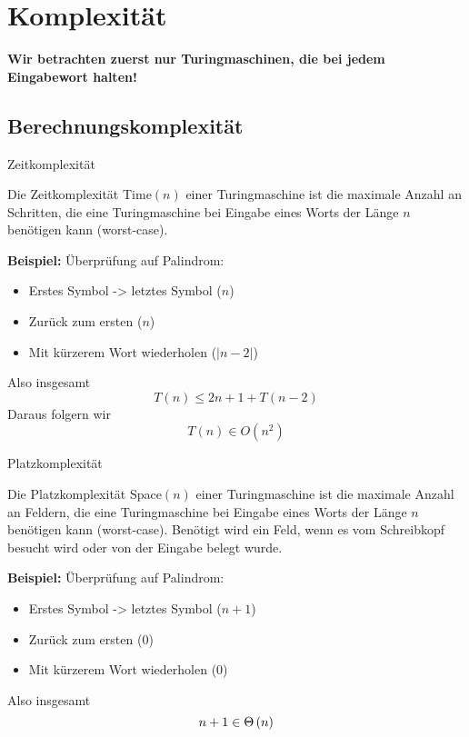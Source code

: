 \section{Komplexität}
\begin{frame}[plain] \large \bf \centering
	Wir betrachten zuerst nur Turingmaschinen, die bei jedem Eingabewort halten!
\end{frame}

\subsection{Berechnungskomplexität}
\begin{frame}{Zeitkomplexität}
	\begin{Definition}
		Die Zeitkomplexität Time$(n)$ einer Turingmaschine ist die maximale Anzahl an Schritten, die eine Turingmaschine bei Eingabe eines Worts der Länge $n$ benötigen kann (worst-case).
	\end{Definition}
	\pause
	\textbf{Beispiel:} Überprüfung auf Palindrom:
	\begin{itemize}[<+->]
		\item Erstes Symbol -> letztes Symbol ($n$) 
		\item Zurück zum ersten ($n$)
		\item Mit kürzerem Wort wiederholen ($|n-2|$)
	\end{itemize} \pause
	Also insgesamt $$T(n) \leq 2n + 1 + T(n-2)$$ 
	Daraus folgern wir $$T(n) \in O(n^2)$$
\end{frame}

\begin{frame}{Platzkomplexität}
	\begin{Definition}
		Die Platzkomplexität Space$(n)$ einer Turingmaschine ist die maximale Anzahl an Feldern, die eine Turingmaschine bei Eingabe eines Worts der Länge $n$ benötigen kann (worst-case). Benötigt wird ein Feld, wenn es vom Schreibkopf besucht wird oder von der Eingabe belegt wurde.
	\end{Definition}
	\pause
	\textbf{Beispiel:} Überprüfung auf Palindrom:
	\begin{itemize}[<+->]
		\item Erstes Symbol -> letztes Symbol ($n + 1$) 
		\item Zurück zum ersten ($0$)
		\item Mit kürzerem Wort wiederholen ($0$)
	\end{itemize} \pause
	Also insgesamt $$n+1 \in \Theta\left(n\right)$$
\end{frame}

